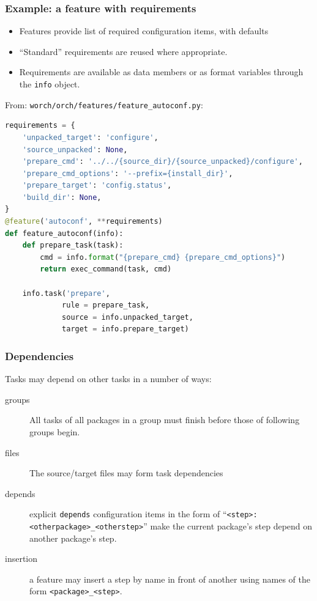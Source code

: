 \documentclass[xcolor=dvipsnames]{beamer}
\begin{document}
\begin{frame}[fragile]
  \frametitle{Example: a feature with requirements}
  \footnotesize

  \begin{itemize}
  \item Features provide list of required configuration items, with defaults

  \item ``Standard'' requirements are reused where appropriate.

  \item Requirements are available as data members or as format
    variables through the \texttt{info} object.

  \end{itemize}

  From: \verb|worch/orch/features/feature_autoconf.py|:
  \begin{lstlisting}[language=Python,basicstyle=\footnotesize\tiny,emph={requirements}]
requirements = {
    'unpacked_target': 'configure',
    'source_unpacked': None,
    'prepare_cmd': '../../{source_dir}/{source_unpacked}/configure',
    'prepare_cmd_options': '--prefix={install_dir}',
    'prepare_target': 'config.status',
    'build_dir': None,
}
@feature('autoconf', **requirements)
def feature_autoconf(info):
    def prepare_task(task):
        cmd = info.format("{prepare_cmd} {prepare_cmd_options}")
        return exec_command(task, cmd)
        
    info.task('prepare',
             rule = prepare_task,
             source = info.unpacked_target,
             target = info.prepare_target)
  \end{lstlisting}

\end{frame}

\begin{frame}[fragile]
  \frametitle{Dependencies}
  Tasks may depend on other tasks in a number of ways:
  \begin{description}
  \item[groups] All tasks of all packages in a group must finish before those of following groups begin.
  \item[files] The source/target files may form task dependencies
  \item[depends] explicit \texttt{depends} configuration items in the form of ``\verb|<step>:<otherpackage>_<otherstep>|'' make the current package's step depend on another package's step.
  \item[insertion] a feature may insert a step by name in front of another using names of the form \verb|<package>_<step>|.
  \end{description}
\end{frame}
\end{document}
